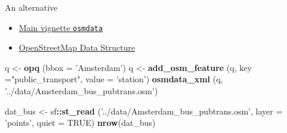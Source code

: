 \documentclass[ignorenonframetext,]{beamer}
\newenvironment{Shaded}{\begin{snugshade}}{\end{snugshade}}
\newcommand{\KeywordTok}[1]{\textcolor[rgb]{0.13,0.29,0.53}{\textbf{#1}}}
\newcommand{\DataTypeTok}[1]{\textcolor[rgb]{0.13,0.29,0.53}{#1}}
\newcommand{\StringTok}[1]{\textcolor[rgb]{0.31,0.60,0.02}{#1}}
\newcommand{\OtherTok}[1]{\textcolor[rgb]{0.56,0.35,0.01}{#1}}
\newcommand{\OperatorTok}[1]{\textcolor[rgb]{0.81,0.36,0.00}{\textbf{#1}}}
\newcommand{\NormalTok}[1]{#1}
\providecommand{\tightlist}{%
  \setlength{\itemsep}{0pt}\setlength{\parskip}{0pt}}
\begin{document}
\begin{frame}[fragile]{An alternative}

\begin{itemize}
\tightlist
\item
  \href{https://github.com/ropensci/osmdata/blob/master/vignettes/osmdata.Rmd}{Main
  vignette \texttt{osmdata}}
\item
  \href{https://cran.r-project.org/web/packages/osmdata/vignettes/osm-sf-translation.html}{OpenStreetMap
  Data Structure}
\end{itemize}

\begin{Shaded}
\begin{Highlighting}[]
\NormalTok{q <-}\StringTok{ }\KeywordTok{opq}\NormalTok{ (}\DataTypeTok{bbox =} \StringTok{'Amsterdam'}\NormalTok{)}
\NormalTok{q <-}\StringTok{ }\KeywordTok{add_osm_feature}\NormalTok{ (q, }\DataTypeTok{key =}\StringTok{"public_transport"}\NormalTok{,}
                      \DataTypeTok{value =} \StringTok{'station'}\NormalTok{) }
\KeywordTok{osmdata_xml}\NormalTok{ (q, }\StringTok{'../data/Amsterdam_bus_pubtrans.osm'}\NormalTok{)}
\end{Highlighting}
\end{Shaded}

\begin{Shaded}
\begin{Highlighting}[]
\NormalTok{dat_bus <-}\StringTok{ }\NormalTok{sf}\OperatorTok{::}\KeywordTok{st_read}\NormalTok{ (}\StringTok{'../data/Amsterdam_bus_pubtrans.osm'}\NormalTok{, }
                        \DataTypeTok{layer =} \StringTok{'points'}\NormalTok{, }\DataTypeTok{quiet =} \OtherTok{TRUE}\NormalTok{)}
\KeywordTok{nrow}\NormalTok{(dat_bus)}
\end{Highlighting}
\end{Shaded}

\end{frame}
\end{document}
